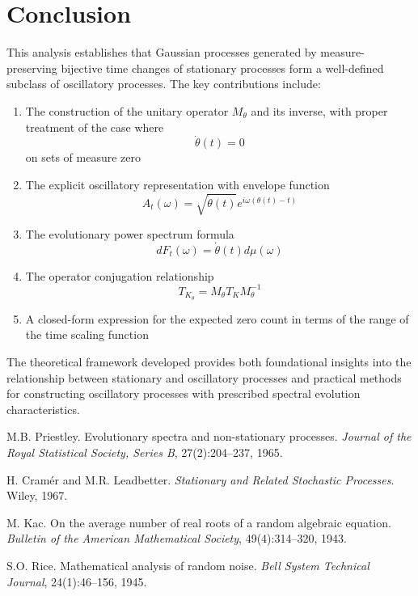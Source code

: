 \documentclass{article}
\newcommand{\tmem}[1]{{\em #1\/}}
\begin{document}
\section{Conclusion}

This analysis establishes that Gaussian processes generated by
measure-preserving bijective time changes of stationary processes form a
well-defined subclass of oscillatory processes. The key contributions include:
\begin{enumerate}
  \item The construction of the unitary operator $M_{\theta}$ and its inverse,
  with proper treatment of the case where
  \begin{equation}
    \dot{\theta} (t) = 0
  \end{equation}
  on sets of measure zero
  
  \item The explicit oscillatory representation with envelope function
  \begin{equation}
    A_t (\omega) = \sqrt{\dot{\theta} (t)} e^{i \omega (\theta (t) - t)}
  \end{equation}
  \item The evolutionary power spectrum formula
  \begin{equation}
    dF_t (\omega) = \dot{\theta} (t) d \mu (\omega)
  \end{equation}
  \item The operator conjugation relationship
  \begin{equation}
    T_{K_{\theta}} = M_{\theta} T_K M_{\theta}^{- 1}
  \end{equation}
  \item A closed-form expression for the expected zero count in terms of the
  range of the time scaling function
\end{enumerate}
The theoretical framework developed provides both foundational insights into
the relationship between stationary and oscillatory processes and practical
methods for constructing oscillatory processes with prescribed spectral
evolution characteristics.

\begin{thebibliography}{99}
  {}M.B. Priestley. Evolutionary spectra and
  non-stationary processes. {\tmem{Journal of the Royal Statistical Society,
  Series B}}, 27(2):204--237, 1965.
  
  {}H. Cram{\'e}r and M.R. Leadbetter. {\tmem{Stationary
  and Related Stochastic Processes}}. Wiley, 1967.
  
  {}M. Kac. On the average number of real roots of a random
  algebraic equation. {\tmem{Bulletin of the American Mathematical Society}},
  49(4):314--320, 1943.
  
  {}S.O. Rice. Mathematical analysis of random noise.
  {\tmem{Bell System Technical Journal}}, 24(1):46--156, 1945.
\end{thebibliography}

\
\end{document}
